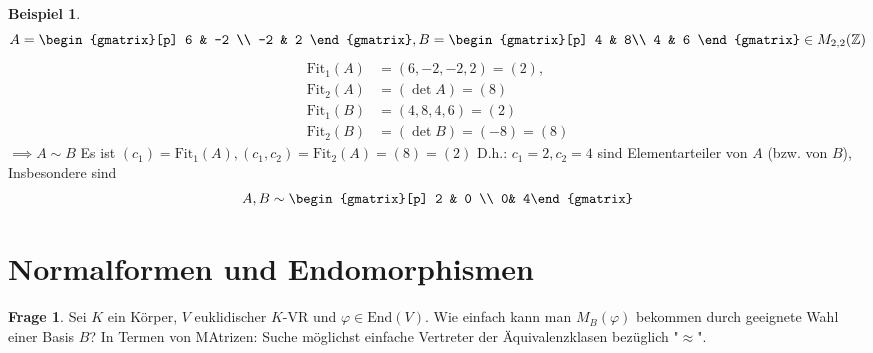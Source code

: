 \documentclass[a4paper, titlepage]{article}
\theoremstyle{definition}
\newtheorem{bsp}[satz]{Beispiel}
\newtheorem*{frage}{Frage}
\newcommand{\Z}{\mathbb{Z}}
\newcommand{\Fit}{\mathrm{Fit}}
\newcommand{\End}{\mathrm{End}}
\begin{document}
\begin{bsp} $$A=\begin{gmatrix}[p]
    6 & -2 \\
    -2 & 2
\end{gmatrix}, B=\begin{gmatrix}[p]
    4 & 8\\
    4 & 6
\end{gmatrix}\in M_{2,2}(\Z)$$
\begin{align*}
    \Fit_{1}(A)&=(6,-2,-2,2)=(2),\\
    \Fit_{2}(A)&=(\det A)=(8)\\
    \Fit_{1}(B)&=(4,8,4,6)=(2)\\
    \Fit_{2}(B)&=(\det B)=(-8)=(8)
\end{align*}
$\implies A\sim B$
Es ist $(c_1)=\Fit_{1}(A), (c_1,c_2)=\Fit_{2}(A)=(8)=(2)$
D.h.: $c_1=2,c_2=4$ sind Elementarteiler von $A$ (bzw. von $B$), Insbesondere sind $$A,B\sim \begin{gmatrix}[p] 2 & 0 \\ 0& 4\end{gmatrix}$$
\end{bsp}
\part{Normalformen und Endomorphismen}
\begin{frage}
    Sei $K$ ein Körper, $V$ euklidischer $K$-VR und $\varphi\in\End(V).$
    Wie einfach kann man $M_B(\varphi)$ bekommen durch geeignete Wahl einer Basis $B$? In Termen von MAtrizen: Suche möglichst einfache Vertreter der Äquivalenzklasen bezüglich "$\approx$".
\end{frage}
\end{document}
